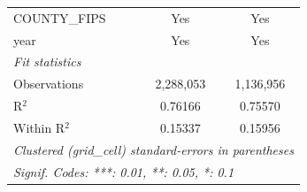 \begin{tabular}{lcc}
   COUNTY\_FIPS                          & Yes             & Yes\\  
   year                                  & Yes             & Yes\\  
   \midrule
   \emph{Fit statistics}\\
   Observations                          & 2,288,053       & 1,136,956\\  
   R$^2$                                 & 0.76166         & 0.75570\\  
   Within R$^2$                          & 0.15337         & 0.15956\\  
   \midrule \midrule
   \multicolumn{3}{l}{\emph{Clustered (grid\_cell) standard-errors in parentheses}}\\
   \multicolumn{3}{l}{\emph{Signif. Codes: ***: 0.01, **: 0.05, *: 0.1}}\\
\end{tabular}
\par\endgroup


